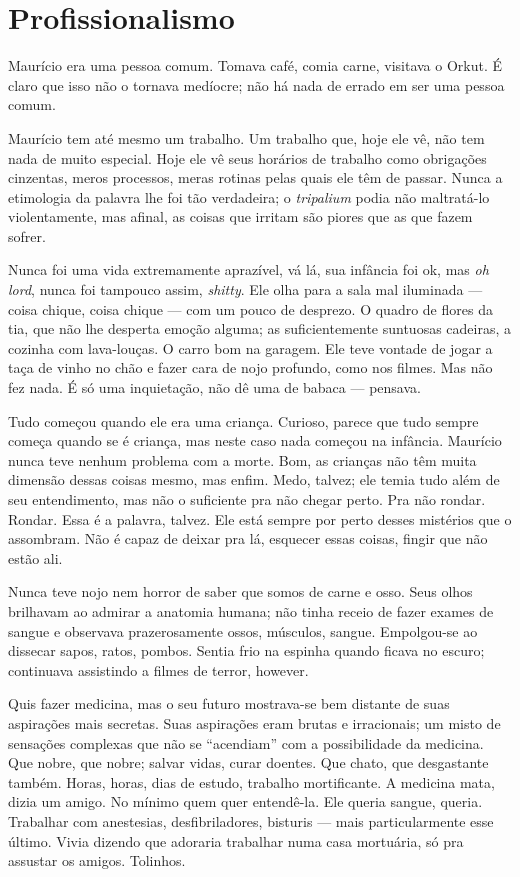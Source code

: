 \chapter{Profissionalismo}

Maurício era uma pessoa comum. Tomava café, comia carne, visitava o Orkut. É claro que isso não o tornava medíocre; não há nada de errado em ser uma pessoa comum.

Maurício tem até mesmo um trabalho. Um trabalho que, hoje ele vê, não tem nada de muito especial. Hoje ele vê seus horários de trabalho como obrigações cinzentas, meros processos, meras rotinas pelas quais ele têm de passar. Nunca a etimologia da palavra lhe foi tão verdadeira; o \emph{tripalium} podia não maltratá-lo violentamente, mas afinal, as coisas que irritam são piores que as que fazem sofrer.

Nunca foi uma vida extremamente aprazível, vá lá, sua infância foi ok, mas \emph{oh lord}, nunca foi tampouco assim, \foreignlanguage{english}{\emph{shitty}}. Ele olha para a sala mal iluminada --- coisa chique, coisa chique --- com um pouco de desprezo. O quadro de flores da tia, que não lhe desperta emoção alguma; as suficientemente suntuosas cadeiras, a cozinha com lava-louças. O carro bom na garagem. Ele teve vontade de jogar a taça de vinho no chão e fazer cara de nojo profundo, como nos filmes. Mas não fez nada. É só uma inquietação, não dê uma de babaca --- pensava.

Tudo começou quando ele era uma criança. Curioso, pa\-re\-ce que tudo sempre começa quando se é criança, mas neste caso nada começou na infância. Maurício nunca teve nenhum problema com a morte. Bom, as crianças não têm muita dimensão dessas coisas mesmo, mas enfim. Medo, talvez; ele temia tudo além de seu entendimento, mas não o suficiente pra não chegar perto. Pra não rondar. Rondar. Essa é a palavra, talvez. Ele está sempre por perto desses mistérios que o assombram. Não é capaz de deixar pra lá, esquecer essas coisas, fingir que não estão ali.

Nunca teve nojo nem horror de saber que somos de carne e osso. Seus olhos brilhavam ao admirar a anatomia humana; não tinha receio de fazer exames de sangue e observava prazerosamente ossos, músculos, sangue. Empolgou-se ao dissecar sapos, ratos, pombos. Sentia frio na espinha quando ficava no escuro; continuava assistindo a filmes de terror, however.

\begin{sloppypar}
Quis fazer medicina, mas o seu futuro mostrava-se bem distante de suas aspirações mais secretas. Suas aspirações eram brutas e irracionais; um misto de sensações complexas que não se ``acendiam'' com a possibilidade da medicina. Que nobre, que nobre; salvar vidas, curar doentes. Que chato, que desgastante também. Horas, horas, dias de estudo, trabalho mortificante. A medicina mata, dizia um amigo. No mínimo quem quer entendê-la. Ele queria sangue, queria. Trabalhar com anestesias, desfibriladores, bisturis --- mais particularmente esse último. Vivia dizendo que adoraria trabalhar numa casa mortuária, só pra assustar os amigos. Tolinhos.
\end{sloppypar}

